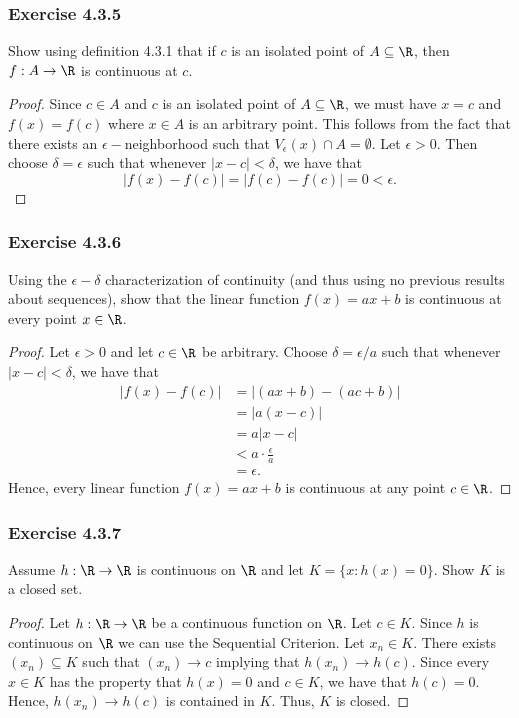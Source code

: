 \subsubsection{Exercise 4.3.5} Show using definition 4.3.1 that if \( c \) is an isolated point of \( A \subseteq \R  \), then \( f: A \to \R  \) is continuous at \( c \).
\begin{proof}
    Since \( c \in A  \) and \( c  \) is an isolated point of \( A \subseteq \R  \), we must have \( x = c  \) and \( f(x) = f(c) \) where \( x \in A  \) is an arbitrary point. This follows from the fact that there exists an \( \epsilon - \)neighborhood such that \( V_{\epsilon }(x) \cap A = \emptyset \). Let \( \epsilon > 0  \). Then choose \( \delta = \epsilon  \) such that whenever \( | x - c  | < \delta \), we have that 
\[ | f(x) - f(c) | = | f(c) - f(c) | = 0 < \epsilon. \]
\end{proof}

\subsubsection{Exercise 4.3.6} Using the \( \epsilon - \delta \) characterization of continuity (and thus using no previous results about sequences), show that the linear function \( f(x) = ax + b  \) is continuous at every point \( x \in \R  \).
\begin{proof}
Let \( \epsilon > 0  \) and let \( c \in \R  \) be arbitrary. Choose \( \delta = \epsilon  / a  \) such that whenever \( | x - c  | < \delta  \), we have that 
\begin{align*}
   | f(x) - f(c) |  &= |  (ax + b ) - (ac + b ) |  \\
                    &= | a ( x - c ) | \\
                    &= a | x - c  | \\
                    &< a \cdot \frac{ \epsilon  }{ a  } \\
                    &= \epsilon.
\end{align*}
Hence, every linear function \( f(x) = ax + b  \) is continuous at any point \( c \in \R  \).
\end{proof}


\subsubsection{Exercise 4.3.7} Assume \( h: \R \to \R  \) is continuous on \( \R  \) and let \( K = \{ x : h(x) = 0  \}  \). Show \( K \) is a closed set.
\begin{proof}
Let \( h: \R \to \R  \) be a continuous function on \( \R  \).  Let \( c \in K  \). Since \( h \) is continuous on \( \R  \) we can use the Sequential Criterion. Let \( x_n \in K  \). There exists  \( (x_n) \subseteq K\) such that \( (x_n) \to  c \) implying that \( h(x_n) \to h(c) \). Since every \( x \in K  \) has the property that \( h(x) = 0  \) and \( c \in K  \), we have that \( h(c) = 0  \). Hence, \( h(x_n) \to h(c) \) is contained in \( K \). Thus, \( K \) is closed. 
\end{proof}








